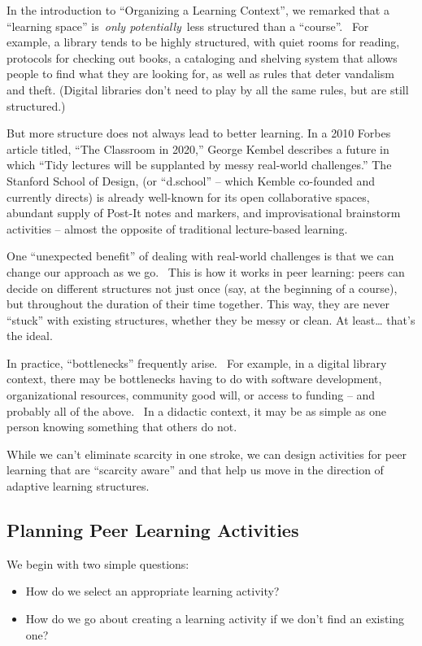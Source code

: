 In the introduction to ``Organizing a Learning Context'', we remarked
that a ``learning space'' is~\emph{only potentially}~less structured
than a ``course''. ~For example, a library tends to be highly
structured, with quiet rooms for reading, protocols for checking out
books, a cataloging and shelving system that allows people to find what
they are looking for, as well as rules that deter vandalism and theft.
(Digital libraries don't need to play by all the same rules, but are
still structured.)

But more structure does not always lead to better learning. In a 2010
Forbes article titled, ``The Classroom in 2020,'' George Kembel
describes a future in which ``Tidy lectures will be supplanted by messy
real-world challenges.'' The Stanford School of Design, (or ``d.school''
-- which Kemble co-founded and currently directs) is already well-known
for its open collaborative spaces, abundant supply of Post-It notes and
markers, and improvisational brainstorm activities -- almost the
opposite of traditional lecture-based learning.

One ``unexpected benefit'' of dealing with real-world challenges is that
we can change our approach as we go. ~This is how it works in peer
learning: peers can decide on different structures not just once (say,
at the beginning of a course), but throughout the duration of their time
together. This way, they are never ``stuck'' with existing structures,
whether they be messy or clean. At least\ldots{} that's the ideal.

In practice, ``bottlenecks'' frequently arise. ~For example, in a
digital library context, there may be bottlenecks having to do with
software development, organizational resources, community good will, or
access to funding -- and probably all of the above. ~In a didactic
context, it may be as simple as one person knowing something that others
do not.

While we can't eliminate scarcity in one stroke, we can design
activities for peer learning that are ``scarcity aware'' and that help
us move in the direction of adaptive learning structures.

\subsection{Planning Peer Learning
Activities}\label{planning-peer-learning-activities}

We begin with two simple questions:

\begin{itemize}
\itemsep1pt\parskip0pt
\item
  How do we select an appropriate learning activity?
\item
  How do we go about creating a learning activity if we don't find an
  existing one?
\end{itemize}

